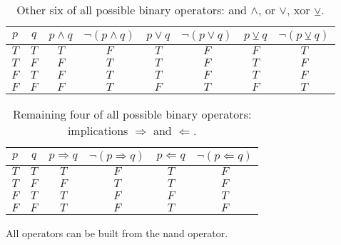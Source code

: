     \begin{table}[h!]
        \centering
        \begin{tabular}{c | c || c | c | c | c | c | c }
            $p$ & $q$ & $p \land q$ & $\lnot (p \land q)$ & $p \lor q$ & $\lnot (p \lor q)$ & $p \veebar q$ & $\lnot (p \veebar q)$\\
            \hline
            \hline
            $T$ & $T$ & $T$ & $F$ & $T$ & $F$ & $F$ & $T$ \\
            $T$ & $F$ & $F$ & $T$ & $T$ & $F$ & $T$ & $F$ \\
            $F$ & $T$ & $F$ & $T$ & $T$ & $F$ & $T$ & $F$ \\
            $F$ & $F$ & $F$ & $T$ & $F$ & $T$ & $F$ & $T$ \\
        \end{tabular}
        \caption{Other six of all possible binary operators: and $\land$, or $\lor$, xor $\veebar$.}
        \label{tab:binop2}
    \end{table}

    \begin{table}[h!]
        \centering
        \begin{tabular}{c | c || c | c | c | c}
            $p$ & $q$ & $p \Rightarrow q$ & $\lnot (p \Rightarrow q)$ & $p \Leftarrow q$ & $\lnot (p \Leftarrow q)$\\
            \hline
            \hline
            $T$ & $T$ & $T$ & $F$ & $T$ & $F$\\
            $T$ & $F$ & $F$ & $T$ & $T$ & $F$\\
            $F$ & $T$ & $T$ & $F$ & $F$ & $T$\\
            $F$ & $F$ & $T$ & $F$ & $T$ & $F$\\
        \end{tabular}
        \caption{Remaining four of all possible binary operators: implications $\Rightarrow$ and $\Leftarrow$.}
        \label{tab:binop3}
    \end{table}

    \begin{theorem}
        All operators can be built from the nand operator.
    \end{theorem}

